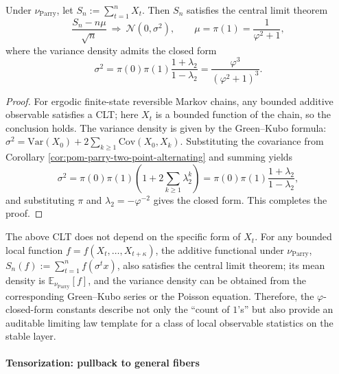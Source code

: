 \begin{theorem}\label{thm:pom-parry-ones-clt}
Under \(\nu_{\mathrm{Parry}}\), let
\(
S_n:=\sum_{t=1}^{n}X_t
\).
Then \(S_n\) satisfies the central limit theorem
\[
\frac{S_n-n\mu}{\sqrt n}\ \Longrightarrow\ \mathcal N(0,\sigma^2),
\qquad
\mu=\pi(1)=\frac{1}{\varphi^2+1},
\]
where the variance density admits the closed form
\[
\sigma^2
=\pi(0)\pi(1)\frac{1+\lambda_2}{1-\lambda_2}
=\frac{\varphi^3}{(\varphi^2+1)^3}.
\]
\end{theorem}
\begin{proof}
For ergodic finite-state reversible Markov chains, any bounded additive observable satisfies a CLT;
here \(X_t\) is a bounded function of the chain, so the conclusion holds.
The variance density is given by the Green--Kubo formula:
\(
\sigma^2=\mathrm{Var}(X_0)+2\sum_{k\ge 1}\mathrm{Cov}(X_0,X_k)
\).
Substituting the covariance from Corollary \ref{cor:pom-parry-two-point-alternating} and summing yields
\[
\sigma^2=\pi(0)\pi(1)\left(1+2\sum_{k\ge 1}\lambda_2^k\right)
=\pi(0)\pi(1)\frac{1+\lambda_2}{1-\lambda_2},
\]
and substituting \(\pi\) and \(\lambda_2=-\varphi^{-2}\) gives the closed form. This completes the proof.
\end{proof}

\begin{remark}\label{rem:pom-parry-additive-functional-clt}
The above CLT does not depend on the specific form of \(X_t\).
For any bounded local function \(f=f(X_t,\dots,X_{t+\kappa})\), the additive functional under \(\nu_{\mathrm{Parry}}\),
\(
S_n(f):=\sum_{t=1}^{n}f(\sigma^t x)
\),
also satisfies the central limit theorem; its mean density is \(\mathbb E_{\nu_{\mathrm{Parry}}}[f]\),
and the variance density can be obtained from the corresponding Green--Kubo series or the Poisson equation.
Therefore, the \(\varphi\)-closed-form constants describe not only the ``count of \(1\)'s'' but also provide an auditable limiting law template for a class of local observable statistics on the stable layer.
\end{remark}

\paragraph{Tensorization: pullback to general fibers}


